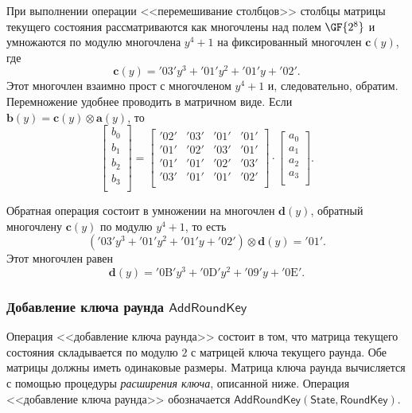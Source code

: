 При выполнении операции <<перемешивание столбцов>> столбцы матрицы текущего состояния рассматриваются как многочлены над полем $\GF{2^8}$ и умножаются по модулю многочлена $y^4 +1$ на фиксированный многочлен $\mathbf{c}(y)$, где
    \[ \mathbf{c}(y) = \mathrm{'03'} y^3 + \mathrm{'01'} y^2 + \mathrm{'01'} y + \mathrm{'02'}. \]
Этот многочлен взаимно прост с многочленом $y^4 + 1$ и, следовательно, обратим. Перемножение удобнее проводить в матричном виде. Если $\mathbf{b}(y) = \mathbf{c}(y) \otimes \mathbf{a}(y)$, то
\[
    \left[ \begin{array}{c}
        b_{0} \\ b_{1} \\ b_{2} \\ b_{3} \\
    \end{array}\right] =  \left[ \begin{array}{cccc}
        \mathrm{'02'} & \mathrm{'03'} & \mathrm{'01'} & \mathrm{'01'} \\
        \mathrm{'01'} & \mathrm{'02'} & \mathrm{'03'} & \mathrm{'01'} \\
        \mathrm{'01'} & \mathrm{'01'} & \mathrm{'02'} & \mathrm{'03'} \\
        \mathrm{'03'} & \mathrm{'01'} & \mathrm{'01'} & \mathrm{'02'} \\
    \end{array} \right] \cdot \left[ \begin{array}{c}
        a_{0} \\ a_{1} \\ a_{2} \\ a_{3} \\
     \end{array} \right].
\]

Обратная операция состоит в умножении на многочлен $\mathbf{d}(y)$, обратный многочлену $\mathbf{c}(y)$ по модулю $y^4 + 1$, то есть
\[
    (\mathrm{'03'} y^{3} + \mathrm{'01'} y^{2} + \mathrm{'01'} y + \mathrm{'02'}) \otimes \mathbf{d}(y) = \mathrm{'01'}.
\]
Этот многочлен равен
\[
    \mathbf{d}(y) = \mathrm{'0B'} y^3 + \mathrm{'0D'} y^2 + \mathrm{'09'} y + \mathrm{'0E'}.
\]


\subsubsection{Добавление ключа раунда $\mathsf{AddRoundKey}$}

Операция <<добавление ключа раунда>> состоит в том, что матрица текущего состояния складывается по модулю $2$ с матрицей ключа текущего раунда. Обе матрицы должны иметь одинаковые размеры. Матрица ключа раунда вычисляется с помощью процедуры \emph{расширения ключа}, описанной ниже. Операция <<добавление ключа раунда>> обозначается $\mathsf{AddRoundKey(State, RoundKey)}$.

